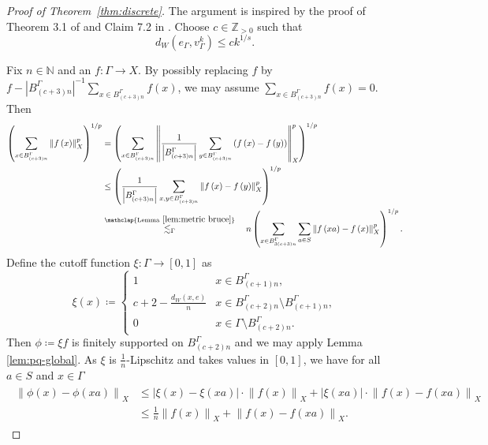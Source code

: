 \documentclass[11pt,reqno]{amsart}
\newcommand{\1}{\mathbf 1}
\begin{document}
\begin{proof}[Proof of Theorem~\ref{thm:discrete}]
The argument is inspired by the proof of Theorem 3.1 of \cite{lafforgue2014vertical} and Claim 7.2 in \cite{austin2013sharp}. Choose $c\in \mathbb{Z}_{>0}$ such that
\[
d_W\left(e_\Gamma,v_\Gamma^k\right)\le c k^{1/s}.
\]


 Fix $n\in \mathbb{N}$ and an $f:\Gamma\to X$. By possibly replacing $f$ by $f-\left|B^\Gamma_{\left(c+3\right)n}\right|^{-1}\sum_{x\in B^\Gamma_{\left(c+3\right)n}}f\left(x\right)$, we may assume $\sum_{x\in B^\Gamma_{\left(c+3\right)n}}f\left(x\right)=0$. Then
\begin{align}\label{eq:use bruce}
\begin{aligned}
\left(\sum_{x\in B^\Gamma_{\left(c+3\right)n}}\left\|f\left(x\right)\right\|_X^p\right)^{1/p}&= \left(\sum_{x\in B^\Gamma_{\left(c+3\right)n}}\left\|\frac{1}{\left|B^\Gamma_{\left(c+3\right)n}\right|}\sum_{y\in B^\Gamma_{\left(c+3\right)n}}\left(f\left(x\right)-f\left(y\right)\right)\right\|_X^p\right)^{1/p}\\
&\le  \left(\frac{1}{\left|B^\Gamma_{\left(c+3\right)n}\right|}\sum_{x,y\in B^\Gamma_{\left(c+3\right)n}}\left\|f\left(x\right)-f\left(y\right)\right\|_X^p\right)^{1/p}\\
&\stackrel{\mathclap{\mathrm{Lemma~}\ref{lem:metric bruce}}}{\lesssim_\Gamma} \quad n\left(\sum_{x\in B^\Gamma_{3\left(c+3\right)n}}\sum_{a\in S}\left\|f\left(xa\right)-f\left(x\right)\right\|_X^p\right)^{1/p}.
\end{aligned}
\end{align}
Define the cutoff function $\xi:\Gamma\to \left[0,1\right]$ as
\[
\xi\left(x\right)\coloneqq \left\{\begin{array}{ll}1& x\in B^\Gamma_{\left(c+1\right)n},\\
c+2-\frac{d_W\left(x,e\right)}{n}& x\in B^\Gamma_{\left(c+2\right)n}\setminus B^\Gamma_{\left(c+1\right)n},\\
0& x\in \Gamma\setminus B^\Gamma_{\left(c+2\right)n}.
\end{array}\right.
\]
Then $\phi \coloneqq \xi f$ is finitely supported on $B^\Gamma_{\left(c+2\right)n}$ and we may apply Lemma \ref{lem:pq-global}. As $\xi$ is $\frac{1}{n}$-Lipschitz and takes values in $\left[0,1\right]$, we have for all $a\in S$ and $x\in \Gamma$ 
\begin{align}\label{eq:tildef}
\begin{aligned}
\left\|\phi\left(x\right)-\phi\left(xa\right)\right\|_X&\le \left|\xi\left(x\right)-\xi\left(xa\right)\right|\cdot\left\|f\left(x\right)\right\|_X+\left|\xi\left(xa\right)\right|\cdot \left\|f\left(x\right)-f\left(xa\right)\right\|_X\\&
\le
\frac{1}{n}\left\|f\left(x\right)\right\|_X+\left\|f\left(x\right)-f\left(xa\right)\right\|_X.
\end{aligned}
\end{align}


\end{proof}
\end{document}
